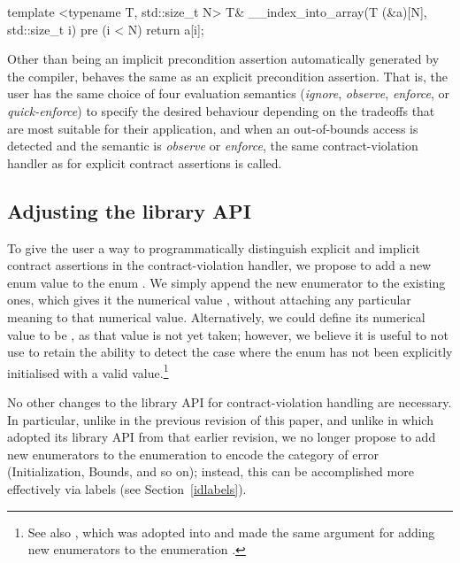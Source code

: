\begin{codeblock}
template <typename T, std::size_t N>
T& __index_into_array(T (&a)[N], std::size_t i)
pre (i < N) {
  return a[i];
}
\end{codeblock}

Other than being an implicit precondition assertion automatically generated by the compiler,  behaves the same as an explicit precondition assertion. That is, the user has the same choice of four evaluation semantics (\emph{ignore}, \emph{observe}, \emph{enforce}, or \emph{quick-enforce}) to specify the desired behaviour depending on the tradeoffs that are most suitable for their application, and when an out-of-bounds access is detected and the semantic is \emph{observe} or \emph{enforce}, the same contract-violation handler as for explicit contract assertions is called.

\subsection{Adjusting the library API}
\label{library}

To give the user a way to programmatically distinguish explicit and implicit contract assertions in the contract-violation handler, we propose to add a new enum value  to the enum \mbox{}. We simply append the new enumerator to the existing ones, which gives it the numerical value , without attaching any particular meaning to that numerical value. Alternatively, we could define its numerical value to be , as that value is not yet taken; however, we believe it is useful to not use  to retain the ability to detect the case where the enum has not been explicitly initialised with a valid value.\footnote{See also \cite{P3227R0}, which was adopted into \cite{P2900R14} and made the same argument for adding new enumerators to the enumeration .}

No other changes to the library API for contract-violation handling are necessary. In particular, unlike in the previous revision of this paper, and unlike in \cite{P3081R1} which adopted its library API from that earlier revision, we no longer propose to add new enumerators to the enumeration \mbox{} to encode the category of error (Initialization, Bounds, and so on); instead, this can be accomplished more effectively via labels (see Section~\ref{idlabels}).

